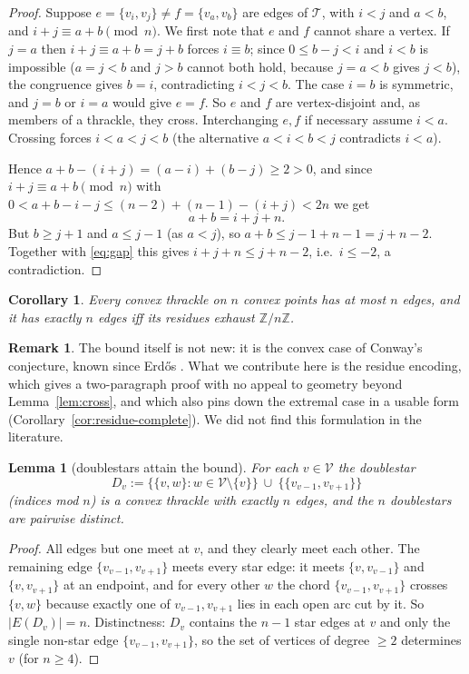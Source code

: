 \documentclass[11pt,a4paper]{article}
\newtheorem{lemma}[theorem]{Lemma}
\newtheorem{corollary}[theorem]{Corollary}
\theoremstyle{definition}
\newtheorem{remark}[theorem]{Remark}
\theoremstyle{plain}
\newcommand{\V}{\mathcal{V}}
\newcommand{\Thr}{\mathcal{T}}
\begin{document}
\begin{proof}
Suppose $e=\{v_i,v_j\}\ne f=\{v_a,v_b\}$ are edges of $\Thr$, with $i<j$ and
$a<b$, and $i+j\equiv a+b \pmod n$.  We first note that $e$ and $f$ cannot
share a vertex.  If $j=a$ then $i+j\equiv a+b=j+b$ forces $i\equiv b$;
since $0\le b-j<i$ and $i<b$ is impossible ($a=j<b$ and $j>b$ cannot both
hold, because $j=a<b$ gives $j<b$), the congruence gives $b=i$, contradicting
$i<j<b$.  The case $i=b$ is symmetric, and $j=b$ or $i=a$ would give $e=f$.
So $e$ and $f$ are vertex-disjoint and, as members of a thrackle, they cross.
Interchanging $e,f$ if necessary assume $i<a$.  Crossing forces $i<a<j<b$ (the
alternative $a<i<b<j$ contradicts $i<a$).

Hence $a+b-(i+j)=(a-i)+(b-j)\ge2>0$, and since $i+j\equiv a+b \pmod n$ with
$0<a+b-i-j\le (n-2)+(n-1)-(i+j)<2n$ we get
\begin{equation}\label{eq:gap}a+b=i+j+n.\end{equation}
But $b\ge j+1$ and $a\le j-1$ (as $a<j$), so $a+b\le j-1+n-1=j+n-2$.
Together with \eqref{eq:gap} this gives $i+j+n\le j+n-2$, i.e.\ $i\le-2$, a
contradiction.
\end{proof}

\begin{corollary}\label{cor:maxedges}
Every convex thrackle on $n$ convex points has at most $n$ edges, and it has
exactly $n$ edges iff its residues exhaust $\mathbb{Z}/n\mathbb{Z}$.
\end{corollary}

\begin{remark}\label{rem:standard}
The bound itself is not new: it is the convex case of Conway's conjecture, known
since Erdős \cite{Erdos}.  What we contribute here is the residue encoding, which
gives a two-paragraph proof with no appeal to geometry beyond
Lemma~\ref{lem:cross}, and which also pins down the extremal case in a usable
form (Corollary~\ref{cor:residue-complete}).  We did not find this formulation in
the literature.
\end{remark}

\begin{lemma}[doublestars attain the bound]\label{lem:tight}
For each $v\in\V$ the \emph{doublestar}
\[
D_v:=\bigl\{\{v,w\}:w\in\V\setminus\{v\}\bigr\}\ \cup\ \bigl\{\{v_{v-1},v_{v+1}\}\bigr\}
\]
(indices mod $n$) is a convex thrackle with exactly $n$ edges, and the $n$
doublestars are pairwise distinct.
\end{lemma}

\begin{proof}
All edges but one meet at $v$, and they clearly meet each other.  The remaining
edge $\{v_{v-1},v_{v+1}\}$ meets every star edge: it meets $\{v,v_{v-1}\}$ and
$\{v,v_{v+1}\}$ at an endpoint, and for every other $w$ the chord
$\{v_{v-1},v_{v+1}\}$ crosses $\{v,w\}$ because exactly one of $v_{v-1},v_{v+1}$
lies in each open arc cut by it.  So $|E(D_v)|=n$.  Distinctness: $D_v$
contains the $n-1$ star edges at $v$ and only the single non-star edge
$\{v_{v-1},v_{v+1}\}$, so the set of vertices of degree $\ge2$ determines $v$
(for $n\ge4$).
\end{proof}
\end{document}
